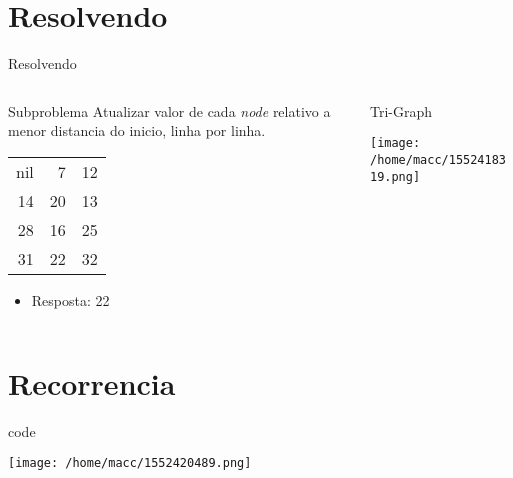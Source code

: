 \documentclass[presentation]{beamer}
\begin{document}
\section{Resolvendo}
\label{sec:org04233b2}
\begin{frame}[label={sec:org5521bd4}]{Resolvendo}
\begin{columns}
\begin{column}{0.48\columnwidth}
\begin{block}{Subproblema}
Atualizar valor de cada \emph{node} relativo a menor distancia do inicio, linha por linha.
\begin{center}
\begin{tabular}{rrr}
\hline
nil & 7 & 12\\
14 & 20 & 13\\
28 & 16 & 25\\
31 & 22 & 32\\
\hline
\end{tabular}
\end{center}

\begin{itemize}
\item Resposta: 22
\end{itemize}
\end{block}
\end{column}
\begin{column}{0.48\columnwidth}
\begin{block}{Tri-Graph}
\begin{center}
\texttt{[image: /home/macc/1552418319.png]}
\label{orgd2a2c8c}
\end{center}
\end{block}
\end{column}
\end{columns}
\end{frame}

\section{Recorrencia}
\label{sec:org8a2e288}
\begin{frame}[label={sec:org59478c5}]{code}
\begin{center}
\texttt{[image: /home/macc/1552420489.png]}
\end{center}
\end{frame}
\end{document}
